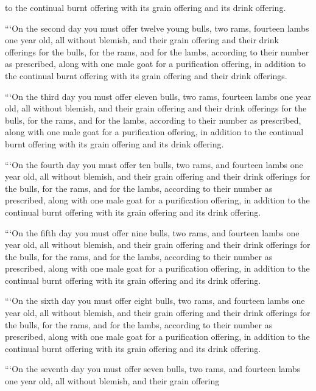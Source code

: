 {to the continual
burnt offering
with its grain offering
and its drink offering.
\par }{\PP {}“‘On the second
day
you must offer twelve
young
bulls,
two
rams,
fourteen
lambs
one year
old, all without blemish,
and their grain offering
and their drink offerings
for the bulls,
for the rams,
and for the lambs,
according to their number
as prescribed,
along with one
male
goat
for a purification
offering, in addition
to the continual
burnt offering
with its grain offering
and their drink offerings.
\par }{\PP {}“‘On
the third
day
you must offer eleven
bulls,
two
rams,
fourteen
lambs
one year
old, all without blemish,
and their grain offering
and their drink offerings
for the bulls,
for the rams,
and for the lambs,
according to their number
as prescribed,
along with one
male goat
for a purification
offering, in addition
to the continual
burnt offering
with its grain offering
and its drink offering.
\par }{\PP {}“‘On the fourth
day
you must offer ten
bulls,
two
rams,
and fourteen
lambs
one year
old, all without blemish,
and their grain offering
and their drink offerings
for the bulls,
for the rams,
and for the lambs,
according to their number
as prescribed,
along with one
male
goat
for a purification
offering, in addition
to the continual
burnt offering
with its grain offering
and its drink offering.
\par }{\PP {}“‘On the fifth
day
you must offer nine
bulls,
two
rams,
and fourteen
lambs
one year
old,
all without blemish,
and their grain offering
and their drink offerings
for the bulls,
for the rams,
and for the lambs,
according to their number
as prescribed,
along with one
male goat
for a purification
offering, in addition
to the continual
burnt offering
with its grain offering
and its drink offering.
\par }{\PP {}“‘On
the sixth
day
you must offer eight
bulls,
two
rams,
and fourteen
lambs
one year
old, all without blemish,
and their grain offering
and their drink offerings
for the bulls,
for the rams,
and for the lambs,
according to their number
as prescribed,
along with one
male goat
for a purification
offering, in addition
to the continual
burnt offering
with its grain offering
and its drink offering.
\par }{\PP {}“‘On
the seventh
day
you must offer seven
bulls,
two
rams,
and fourteen
lambs
one year
old, all without blemish,
and their grain offering
}
